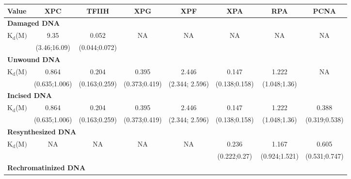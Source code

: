 \begin{landscape}
	\centering
\begin{table}[t]
	\begin{adjustwidth}{}{}
	\small{
	\begin{tabular}[angle=90]{p{2cm}ccccccc}
	\hline
	\textbf{Value}    & \textbf{ XPC} & \textbf{TFIIH} & \textbf{XPG} & \textbf{XPF} & \textbf{XPA} & \textbf{RPA} & \textbf{PCNA}  \\
	\hline
	\multicolumn{8}{l}{\textbf{Damaged DNA}} \\
	$\text{K}_{\text{d}}$({\textmu}$\text{M})$                                                  & 9.35                & 0.052 & NA &NA&NA&NA&NA     \\
	& (3.46;16.09)     &(0.044;0.072)  &&&&&   \\
	\multicolumn{8}{l}{\textbf{Unwound DNA}} \\
	$\text{K}_{\text{d}}$({\textmu}$\text{M})$                                                  & 0.864                     & 0.204                   & 0.395                 &2.446                 &0.147                    &1.222                    &NA     \\
	& (0.635;1.006)     & (0.163;0.259)             & (0.373;0.419)		&(2.344; 2.596)&(0.138;0.158)     &  (1.048;1.36)  &   \\
	\multicolumn{8}{l}{\textbf{Incised DNA}} \\
	$\text{K}_{\text{d}}$({\textmu}$\text{M})$                                                  & 0.864                     & 0.204                   & 0.395                 &2.446                 &0.147                    &1.222                    &0.388     \\
	& (0.635;1.006)     & (0.163;0.259)             & (0.373;0.419)		&(2.344; 2.596)&(0.138;0.158)     &  (1.048;1.36) 	 & (0.319;0.538)  \\
	\multicolumn{8}{l}{\textbf{Resynthesized DNA}} \\
	$\text{K}_{\text{d}}$({\textmu}$\text{M})$                                                  & NA                          &NA                         & NA                      &NA                      &0.236                   &1.167                    &0.605     \\
	&                               &                              &                           &                          &(0.222;0.27)     &  (0.924;1.521)  & (0.531;0.747)  \\
	\multicolumn{8}{l}{\textbf{Rechromatinized DNA}} \\

\end{tabular}}
\end{adjustwidth}
\end{table}
\end{landscape}
